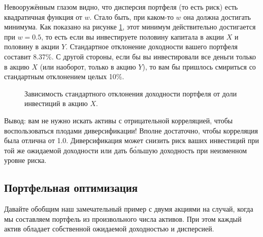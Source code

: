 Невооружённым глазом видно, что дисперсия портфеля (то есть риск) есть квадратичная функция от $w$. Стало быть, при каком-то $w$ она должна достигать минимума. Как показано на рисунке \ref{portfolio_volatility_vs_w}, этот минимум действительно достигается при $w=0.5$, то есть если вы инвестируете половину капитала в акции $X$ и половину в акции $Y$. Стандартное отклонение доходности вашего портфеля составит 8.37\%. С другой стороны, если бы вы инвестировали все деньги только в акцию $X$ (или наоборот, только в акцию $Y$), то вам бы пришлось смириться со стандартным отклонением целых 10\%.

\begin{figure}[h]
\centering
{}
\caption{Зависимость стандартного отклонения доходности портфеля от доли инвестиций в акцию $X$.}
\label{portfolio_volatility_vs_w}
\end{figure}

Вывод: вам не нужно искать активы с отрицательной корреляцией, чтобы воспользоваться плодами диверсификации! Вполне достаточно, чтобы корреляция была отлична от 1.0. Диверсификация может снизить риск ваших инвестиций при той же ожидаемой доходности или дать б\'{о}льшую доходность при неизменном уровне риска.

\subsection{Портфельная оптимизация}

Давайте обобщим наш замечательный пример с двумя акциями на случай, когда мы составляем портфель из произвольного числа активов. При этом каждый актив обладает собственной ожидаемой доходностью и дисперсией.

